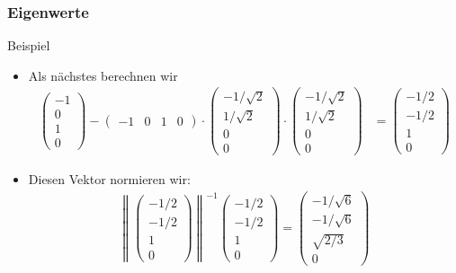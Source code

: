 \documentclass{beamer}
\newcommand\norm[1]{\left\|{#1}\right\|}
\renewcommand{\ae}{\"a}
\newcommand{\mytitle}{Eigenwerte}
\begin{document}
\begin{frame}\frametitle{\mytitle}
	\begin{block}{Beispiel}
	\begin{itemize}
		\item Als n\ae chstes berechnen wir
			\begin{align*}
				\begin{pmatrix} -1\\0\\1\\0 \end{pmatrix}-\begin{pmatrix} -1&0&1&0 \end{pmatrix}\cdot \begin{pmatrix} -1/\sqrt 2\\1/\sqrt 2\\0\\0 \end{pmatrix}\cdot \begin{pmatrix} -1/\sqrt 2\\1/\sqrt 2\\0\\0 \end{pmatrix}&=\begin{pmatrix} -1/2\\-1/2\\1\\0
				\end{pmatrix}
			\end{align*}
		\item Diesen Vektor normieren wir:
			\begin{align*}
				\norm{\begin{pmatrix} -1/2\\-1/2\\1\\0\end{pmatrix}}^{-1} \begin{pmatrix} -1/2\\-1/2\\1\\0\end{pmatrix}=\begin{pmatrix}-1/\sqrt 6\\-1/\sqrt 6\\\sqrt{2/3}\\0\end{pmatrix}
			\end{align*}
	\end{itemize}
	\end{block}
\end{frame}
\end{document}
